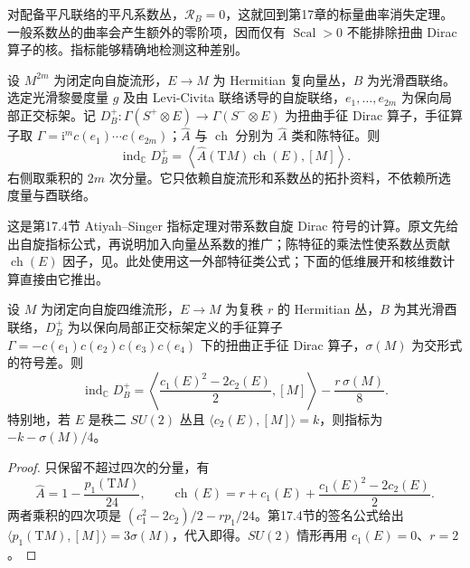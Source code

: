 对配备平凡联络的平凡系数丛，\(\mathcal R_B=0\)，这就回到第17章的标量曲率消失定理。一般系数丛的曲率会产生额外的零阶项，因而仅有 \(\operatorname{Scal}>0\) 不能排除扭曲 Dirac 算子的核。指标能够精确地检测这种差别。

\begin{theorem}[扭曲自旋指标公式]\label{g3:thm:B-twisted-spin-index}
 设 \(M^{2m}\) 为闭定向自旋流形，\(E\to M\) 为 Hermitian 复向量丛，\(B\) 为光滑酉联络。选定光滑黎曼度量 \(g\) 及由 Levi-Civita 联络诱导的自旋联络，\(e_1,\ldots,e_{2m}\) 为保向局部正交标架。记 \(D_B^+:\Gamma(S^+\otimes E)\to\Gamma(S^-\otimes E)\) 为扭曲手征 Dirac 算子，手征算子取 \(\Gamma=\mathrm i^m c(e_1)\cdots c(e_{2m})\)；\(\widehat A\) 与 \(\operatorname{ch}\) 分别为 \(\widehat A\) 类和陈特征。则
 \begin{equation}\label{g3:eq:B-twisted-spin-index}
  \operatorname{ind}_{\mathbb C}D_B^+
   =\left\langle\widehat A(\mathrm TM)\operatorname{ch}(E),[M]\right\rangle.
 \end{equation}
 右侧取乘积的 \(2m\) 次分量。它只依赖自旋流形和系数丛的拓扑资料，不依赖所选度量与酉联络。
\end{theorem}

这是第17.4节 Atiyah--Singer 指标定理对带系数自旋 Dirac 符号的计算。原文先给出自旋指标公式，再说明加入向量丛系数的推广；陈特征的乘法性使系数丛贡献 \(\operatorname{ch}(E)\) 因子，见\cite[第2节命题(2.17)，第559页；第5节定理(5.3)及其后注2，第570--571页]{AtiyahSinger1968III}。此处使用这一外部特征类公式；下面的低维展开和核维数计算直接由它推出。

\begin{proposition}\label{g3:prop:B-four-dimensional-twisted-index}
 设 \(M\) 为闭定向自旋四维流形，\(E\to M\) 为复秩 \(r\) 的 Hermitian 丛，\(B\) 为其光滑酉联络，\(D_B^+\) 为以保向局部正交标架定义的手征算子 \(\Gamma=-c(e_1)c(e_2)c(e_3)c(e_4)\) 下的扭曲正手征 Dirac 算子，\(\sigma(M)\) 为交形式的符号差。则
 \begin{equation}\label{g3:eq:B-four-dimensional-twisted-index}
  \operatorname{ind}_{\mathbb C}D_B^+
   =\left\langle\frac{c_1(E)^2-2c_2(E)}2,[M]\right\rangle
     -\frac{r\,\sigma(M)}8.
 \end{equation}
 特别地，若 \(E\) 是秩二 \(SU(2)\) 丛且 \(\langle c_2(E),[M]\rangle=k\)，则指标为 \(-k-\sigma(M)/4\)。
\end{proposition}
\begin{proof}
 只保留不超过四次的分量，有
 \[
  \widehat A=1-\frac{p_1(\mathrm TM)}{24},\qquad
  \operatorname{ch}(E)=r+c_1(E)+\frac{c_1(E)^2-2c_2(E)}2.
 \]
 两者乘积的四次项是 \((c_1^2-2c_2)/2-rp_1/24\)。第17.4节的签名公式给出 \(\langle p_1(\mathrm TM),[M]\rangle=3\sigma(M)\)，代入即得。\(SU(2)\) 情形再用 \(c_1(E)=0\)、\(r=2\)。
\end{proof}

